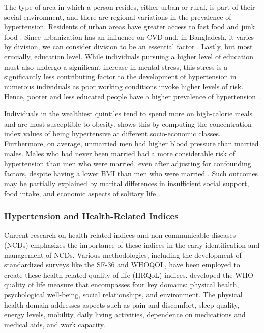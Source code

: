 \documentclass[
  12pt,
  a4paper]{article}
\begin{document}
The type of area in which a person resides, either urban or rural, is part of their social environment, and there are regional variations in the prevalence of hypertension. Residents of urban areas have greater access to fast food and junk food \citep{zahangir_malnutrition_2017}. Since urbanization has an influence on CVD and, in Bangladesh, it varies by division, we can consider division to be an essential factor \citep{yusuf2001global}. Lastly, but most crucially, education level. While individuals pursuing a higher level of education must also undergo a significant increase in mental stress, this stress is a significantly less contributing factor to the development of hypertension in numerous individuals as poor working conditions invoke higher levels of risk. Hence, poorer and less educated people have a higher prevalence of hypertension \citep{leng2015socioeconomic}.

Individuals in the wealthiest quintiles tend to spend more on high-calorie meals and are most susceptible to obesity. \citet{biswas_socio-economic_2016} shows this by computing the concentration index values of being hypertensive at different socio-economic classes. Furthermore, on average, unmarried men had higher blood pressure than married males. Males who had never been married had a more considerable risk of hypertension than men who were married, even after adjusting for confounding factors, despite having a lower BMI than men who were married \citep{ramezankhani2019associations}. Such outcomes may be partially explained by marital differences in insufficient social support, food intake, and economic aspects of solitary life \citep{lipowicz_marital_2005}.

\subsubsection{Hypertension and Health-Related Indices}\label{hypertension-and-health-related-indices}

Current research on health-related indices and non-communicable diseases (NCDs) emphasizes the importance of these indices in the early identification and management of NCDs. Various methodologies, including the development of standardized surveys like the SF-36 and WHOQOL, have been employed to create these health-related quality of life (HRQoL) indices. \citet{whoqol1998development} developed the WHO quality of life measure that encompasses four key domains: physical health, psychological well-being, social relationships, and environment. The physical health domain addresses aspects such as pain and discomfort, sleep quality, energy levels, mobility, daily living activities, dependence on medications and medical aids, and work capacity.
\end{document}
